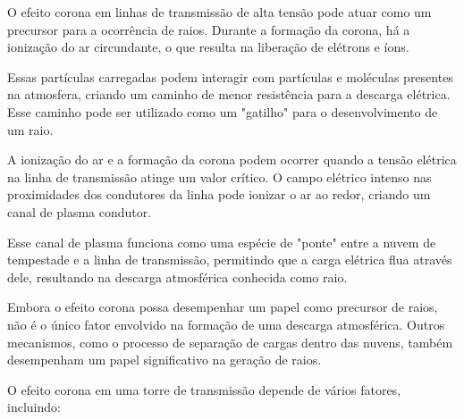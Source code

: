 \documentclass[a4paper, 12pt, onecolumn,singlespacing]{article}
\begin{document}
		O efeito corona em linhas de transmissão de alta tensão pode atuar como um precursor para a ocorrência de raios. Durante a formação da corona, há a ionização do ar circundante, o que resulta na liberação de elétrons e íons.
		
		Essas partículas carregadas podem interagir com partículas e moléculas presentes na atmosfera, criando um caminho de menor resistência para a descarga elétrica. Esse caminho pode ser utilizado como um "gatilho" para o desenvolvimento de um raio.
		
		A ionização do ar e a formação da corona podem ocorrer quando a tensão elétrica na linha de transmissão atinge um valor crítico. O campo elétrico intenso nas proximidades dos condutores da linha pode ionizar o ar ao redor, criando um canal de plasma condutor.
		
		Esse canal de plasma funciona como uma espécie de "ponte" entre a nuvem de tempestade e a linha de transmissão, permitindo que a carga elétrica flua através dele, resultando na descarga atmosférica conhecida como raio.
		
		Embora o efeito corona possa desempenhar um papel como precursor de raios, não é o único fator envolvido na formação de uma descarga atmosférica. Outros mecanismos, como o processo de separação de cargas dentro das nuvens, também desempenham um papel significativo na geração de raios.
		
		O efeito corona em uma torre de transmissão depende de vários fatores, incluindo:
		
\end{document}
